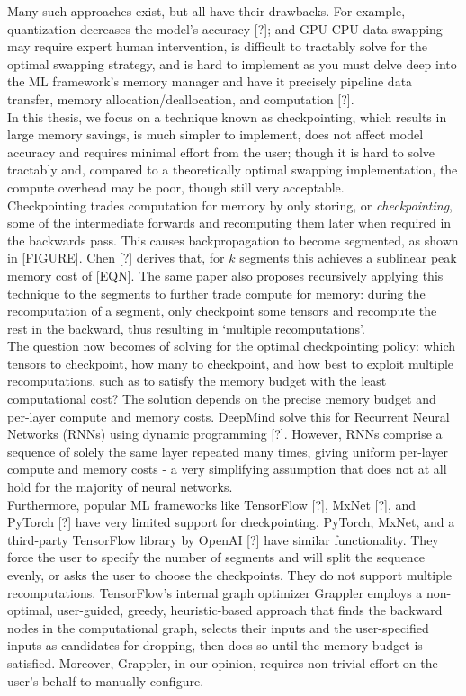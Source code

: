 Many such approaches exist, but all have their drawbacks. For example, quantization decreases the model's accuracy [?]; and GPU-CPU data swapping may require expert human intervention, is difficult to tractably solve for the optimal swapping strategy, and is hard to implement as you must delve deep into the ML framework's memory manager and have it precisely pipeline data transfer, memory allocation/deallocation, and computation [?]. \\

In this thesis, we focus on a technique known as checkpointing, which results in large memory savings, is much simpler to implement, does not affect model accuracy and requires minimal effort from the user; though it is hard to solve tractably and, compared to a theoretically optimal swapping implementation, the compute overhead may be poor, though still very acceptable. \\

Checkpointing trades computation for memory by only storing, or \textit{checkpointing}, some of the intermediate forwards and recomputing them later when required in the backwards pass. This causes backpropagation to become segmented, as shown in [FIGURE]. Chen [?] derives that, for \(k\) segments this achieves a sublinear peak memory cost of [EQN]. The same paper also proposes recursively applying this technique to the segments to further trade compute for memory: during the recomputation of a segment, only checkpoint some tensors and recompute the rest in the backward, thus resulting in `multiple recomputations'. \\

The question now becomes of solving for the optimal checkpointing policy: which tensors to checkpoint, how many to checkpoint, and how best to exploit multiple recomputations, such as to satisfy the memory budget with the least computational cost? The solution depends on the precise memory budget and per-layer compute and memory costs. DeepMind solve this for Recurrent Neural Networks (RNNs) using dynamic programming [?]. However, RNNs comprise a sequence of solely the same layer repeated many times, giving uniform per-layer compute and memory costs - a very simplifying assumption that does not at all hold for the majority of neural networks. \\

Furthermore, popular ML frameworks like TensorFlow [?], MxNet [?], and PyTorch [?] have very limited support for checkpointing. PyTorch, MxNet, and a third-party TensorFlow library by OpenAI [?] have similar functionality. They force the user to specify the number of segments and will split the sequence evenly, or asks the user to choose the checkpoints. They do not support multiple recomputations. TensorFlow's internal graph optimizer Grappler employs a non-optimal, user-guided, greedy, heuristic-based approach that finds the backward nodes in the computational graph, selects their inputs and the user-specified inputs as candidates for dropping, then does so until the memory budget is satisfied. Moreover, Grappler, in our opinion, requires non-trivial effort on the user's behalf to manually configure. \\

